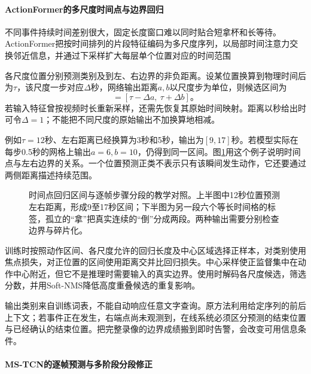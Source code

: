 \paragraph{ActionFormer的多尺度时间点与边界回归}
\label{sec:vision-video-actionformer}

不同事件持续时间差别很大，固定长度窗口难以同时贴合短拿杯和长等待。ActionFormer把按时间排列的片段特征编码为多尺度序列，以局部时间注意力交换邻近信息，并通过下采样扩大每层单个位置对应的时间范围

各尺度位置分别预测类别及到左、右边界的非负距离。设某位置换算到物理时间后为$\tau$，该尺度一步对应$\Delta$秒，网络输出距离$a,b$以尺度步为单位，则候选区间为
\begin{equation}
  [\widehat{\tau}_{\mathrm{s}},\widehat{\tau}_{\mathrm{e}}]
  =[\tau-\Delta a,\ \tau+\Delta b]\text{。}
  \label{eq:vision-video-boundaries}
\end{equation}
若输入特征曾按视频时长重新采样，还需先恢复其原始时间映射。距离以秒给出时可令$\Delta=1$；不能把不同尺度的原始输出不加换算地相减。

例如$\tau=12$秒、左右距离已经换算为3秒和5秒，输出为$[9,17]$秒。若模型实际在每步0.5秒的网格上输出$a=6,b=10$，仍得到同一区间。图\ref{fig:vision-temporal-boundaries}用这个例子说明时间点与左右边界的关系。一个位置预测正类不表示只有该瞬间发生动作，它还要通过两侧距离描述持续范围。

\begin{figure}[htbp]
  \centering
  
  \caption{时间点回归区间与逐帧步骤分段的教学对照。上半图中12秒位置预测左右距离，形成9至17秒区间；下半图为另一段六个等长时间格的标签，孤立的“拿”把真实连续的“倒”分成两段。两种输出需要分别检查边界与碎片化。}
  \label{fig:vision-temporal-boundaries}
\end{figure}

训练时按照动作区间、各尺度允许的回归长度及中心区域选择正样本，对类别使用焦点损失，对正位置的区间使用距离交并比回归损失。中心采样使正监督集中在动作中心附近，但它不是推理时需要输入的真实边界。使用时解码各尺度候选，筛选分数，并用Soft-NMS降低高度重叠候选的重复影响。

输出类别来自训练词表，不能自动响应任意文字查询。原方法利用给定序列的前后上下文；若事件正在发生，右端点尚未观测到，在线系统必须区分预测的结束位置与已经确认的结束位置。把完整录像的边界成绩搬到即时告警，会改变可用信息条件。

\paragraph{MS-TCN的逐帧预测与多阶段分段修正}
\label{sec:vision-video-mstcn}

